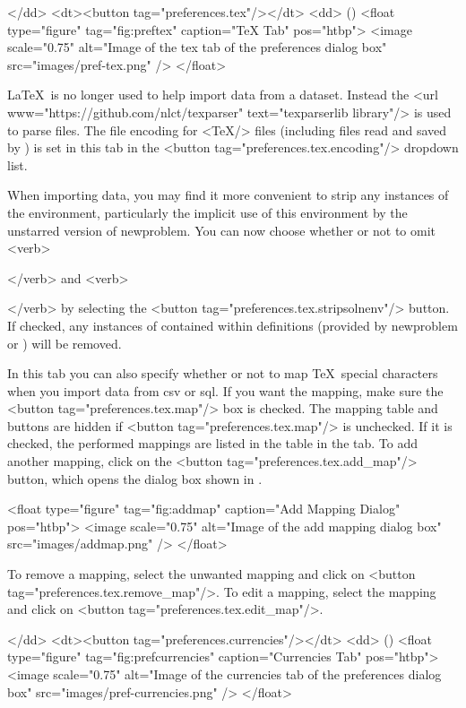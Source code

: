     </dd>
    <dt><button tag="preferences.tex"/></dt>
    <dd>
     ()
     <float type="figure" tag="fig:preftex" caption="TeX Tab" pos="htbp">
      <image scale="0.75" alt="Image of the tex tab of the preferences dialog box" src="images/pref-tex.png" />
     </float>

    \LaTeX\ is no longer used to help  import data from 
    a  dataset. Instead the <url 
     www="https://github.com/nlct/texparser"
     text="texparserlib library"/> is used to parse  files. The file encoding for <TeX/>
    files (including  files read and saved by ) is set in this tab in the <button tag="preferences.tex.encoding"/> dropdown list.


    When importing  data, you may find it more convenient
    to strip any instances of the  environment, 
    particularly the implicit use of this environment by the
    unstarred version of \gls{newproblem}. You can now choose whether or 
    not to omit <verb>\begin{solution}</verb> and <verb>\end{solution}</verb>
    by selecting the <button tag="preferences.tex.stripsolnenv"/> button.
    If checked, any instances of  contained within 
    definitions (provided by \gls{newproblem} or ) 
    will be removed.

In this tab you can also specify whether or not to map \TeX\ special 
    characters when you import data from \gls{csv} or \gls{sql}.
    If you want the mapping, make sure the <button tag="preferences.tex.map"/>
    box is checked. The mapping table and buttons are hidden if 
    <button tag="preferences.tex.map"/> is unchecked. If it is checked, 
    the performed mappings are listed
    in the table in the tab. To add another mapping, click on the
    <button tag="preferences.tex.add_map"/> button, which opens the 
    dialog box shown in . 

     <float type="figure" tag="fig:addmap" caption="Add Mapping Dialog" pos="htbp">
      <image scale="0.75" alt="Image of the add mapping dialog box" src="images/addmap.png" />
     </float>

    To remove a mapping, select the unwanted mapping and click on 
    <button tag="preferences.tex.remove_map"/>. To edit a mapping,
    select the mapping and click on <button tag="preferences.tex.edit_map"/>.

    </dd>
    <dt><button tag="preferences.currencies"/></dt>
    <dd>
     ()
     <float type="figure" tag="fig:prefcurrencies" caption="Currencies Tab" pos="htbp">
      <image scale="0.75" alt="Image of the currencies tab of the preferences dialog box" src="images/pref-currencies.png" />
     </float>

